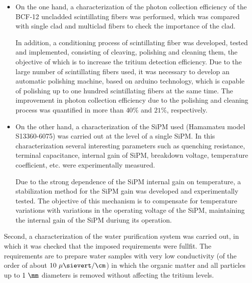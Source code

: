 \begin{itemize}

\item{} On the one hand, a characterization of the photon collection efficiency of the BCF-12 uncladded scintillating fibers was performed, which was compared with single clad and multiclad fibers to check the importance of the clad. 

In addition, a conditioning process of scintillating fiber was developed, tested and implemented, consisting of cleaving, polishing and cleaning them, the objective of which is to increase the tritium detection efficiency. Due to the large number of scintillating fibers used, it was necessary to develop an automatic polishing machine, based on arduino technology, which is capable of polishing up to one hundred scintillating fibers at the same time. The improvement in photon collection efficiency due to the polishing and cleaning process was quantified in more than $40\%$ and $21\%$, respectively. 

\item{} On the other hand, a characterization of the SiPM used (Hamamatsu model S13360-6075) was carried out at the level of a single SiPM. In this characterization several interesting parameters such as quenching resistance, terminal capacitance, internal gain of SiPM, breakdown voltage, temperature coefficient, etc. were experimentally measured. %

Due to the strong dependence of the SiPM internal gain on temperature, a stabilization method for the SiPM gain was developed and experimentally tested. The objective of this mechanism is to compensate for temperature variations with variations in the operating voltage of the SiPM, maintaining the internal gain of the SiPM duriung its operation.

\end{itemize}

Second, a characterization of the water purification system was carried out, in which it was checked that the imposed requirements were fullfit. The requirements are to prepare water samples with very low conductivity (of the order of about $10~\mu\sievert/\cm$) in which the organic matter and all particles up to $1~\mm$ diameters is removed without affecting the tritium levels.

